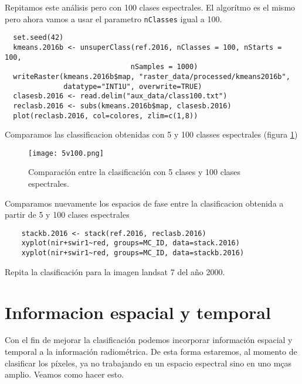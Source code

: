 \begin{exa}
  Repitamos este an\'alisis pero con 100 clases espectrales. El algor\'itmo es el mismo pero ahora vamos a usar el parametro \texttt{nClasses} igual a 100.

  \begin{lstlisting}
  set.seed(42)
  kmeans.2016b <- unsuperClass(ref.2016, nClasses = 100, nStarts = 100,
                              nSamples = 1000)
  writeRaster(kmeans.2016b$map, "raster_data/processed/kmeans2016b",
              datatype="INT1U", overwrite=TRUE)
  clasesb.2016 <- read.delim("aux_data/class100.txt")
  reclasb.2016 <- subs(kmeans.2016b$map, clasesb.2016)
  plot(reclasb.2016, col=colores, zlim=c(1,8))
  \end{lstlisting}

  Comparamos las classificacion obtenidas con 5 y 100 classes espectrales (figura \ref{fig:5v100})

  \begin{figure}[h!]
    \centering
    \texttt{[image: 5v100.png]}
    \caption{Comparaci\'on entre la clasificaci\'on con 5 clases y 100 clases espectrales.}
    \label{fig:5v100}
  \end{figure}

  Comparamos nuevamente los espacios de fase entre la clasificacion obtenida a partir de 5 y 100 clases espectrales
  \begin{lstlisting}
    stackb.2016 <- stack(ref.2016, reclasb.2016)
    xyplot(nir+swir1~red, groups=MC_ID, data=stack.2016)
    xyplot(nir+swir1~red, groups=MC_ID, data=stackb.2016)
  \end{lstlisting}

\end{exa}

\begin{act}
  Repita la clasificaci\'on para la imagen landsat 7 del año 2000.
\end{act}


\section{Informacion espacial y temporal}

Con el fin de mejorar la clasificaci\'on podemos incorporar informaci\'on espacial y temporal a la informaci\'on radiom\'etrica. De esta forma estaremos, al momento de clasificar los p\'ixeles, ya no trabajando en un espacio espectral sino en uno mças amplio. Veamos como hacer esto.

